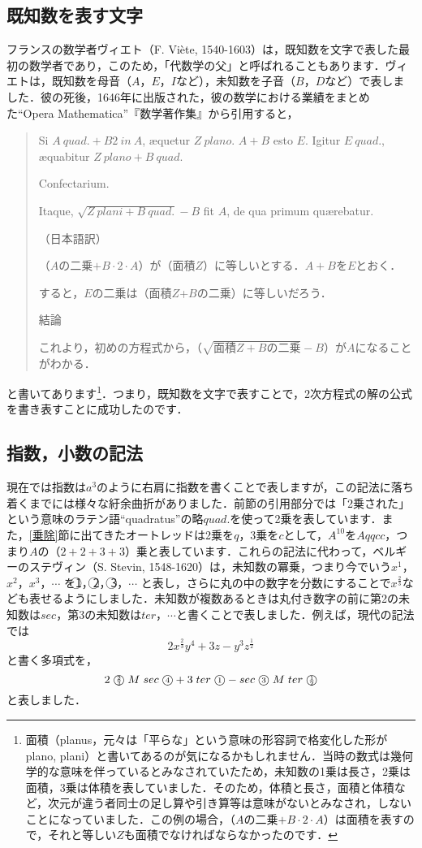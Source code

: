 \documentclass[8pt,a4j]{jreport}
\begin{document}
\subsection{既知数を表す文字}
フランスの数学者ヴィエト（F. Vi\`ete, 1540-1603）は，既知数を文字で表した最初の数学者であり，このため，「代数学の父」と呼ばれることもあります．ヴィエトは，既知数を母音（$A$，$E$，$I$など），未知数を子音（$B$，$D$など）で表しました．彼の死後，1646年に出版された，彼の数学における業績をまとめた``Opera Mathematica''『数学著作集』から引用すると，
\begin{quote}
Si $A\ quad. +B2\ in\ A$, \ae quetur $Z\ plano$. $A+B$ esto $E$. Igitur $E\ quad.$, \ae quabitur $Z\ plano+B\ quad.$

Confectarium.

Itaque, $\sqrt{Z\ plani+B\ quad.}-B$ fit $A$, de qua primum qu\ae rebatur.\smallskip

（日本語訳）

（$A$の二乗$+B\cdot 2\cdot A$）が（面積$Z$）に等しいとする．$A+B$を$E$とおく．

すると，$E$の二乗は（面積$Z$+$B$の二乗）に等しいだろう．

結論

これより，初めの方程式から，（$\sqrt{\mbox{面積}Z+B\mbox{の二乗}}-B$）が$A$になることがわかる．
\end{quote}
と書いてあります\footnote{面積（planus，元々は「平らな」という意味の形容詞で格変化した形がplano, plani）と書いてあるのが気になるかもしれません．当時の数式は幾何学的な意味を伴っているとみなされていたため，未知数の1乗は長さ，2乗は面積，3乗は体積を表していました．そのため，体積と長さ，面積と体積など，次元が違う者同士の足し算や引き算等は意味がないとみなされ，しないことになっていました．この例の場合，（$A$の二乗$+B\cdot 2\cdot A$）は面積を表すので，それと等しい$Z$も面積でなければならなかったのです．}．つまり，既知数を文字で表すことで，2次方程式の解の公式を書き表すことに成功したのです．

\subsection{指数，小数の記法}
現在では指数は$a^3$のように右肩に指数を書くことで表しますが，この記法に落ち着くまでには様々な紆余曲折がありました．前節の引用部分では「2乗された」という意味のラテン語``quadratus''の略$quad.$を使って2乗を表しています．また，\ref{乗除}節に出てきたオートレッドは2乗を$q$，3乗を$c$として，$A^{10}$を$Aqqcc$，つまり$A$の（$2+2+3+3$）乗と表しています．これらの記法に代わって，ベルギーのステヴィン（S. Stevin, 1548-1620）は，未知数の冪乗，つまり今でいう$x^1$，$x^2$，$x^3$，$\cdots$ を\textcircled{\scriptsize 1}，\textcircled{\scriptsize 2}，\textcircled{\scriptsize 3}，$\cdots$ と表し，さらに丸の中の数字を分数にすることで$x^{\frac{2}{3}}$なども表せるようにしました．未知数が複数あるときは丸付き数字の前に第2の未知数は$sec$，第3の未知数は$ter$，$\cdots$と書くことで表しました．例えば，現代の記法では
\[
2x^{\frac{2}{3}}y^4+3z-y^3z^{\frac{1}{2}}
\]
と書く多項式を，
\[
2\;\mbox{\textcircled{\scriptsize $\frac{2}{3}$}}\;M\;sec\;\mbox{\textcircled{\scriptsize 4}}+3\;ter\;\mbox{\textcircled{\scriptsize 1}}-sec\;\mbox{\textcircled{\scriptsize 3}}\;M\;ter\;\mbox{\textcircled{\scriptsize $\frac{1}{2}$}}
\]
と表しました．
\end{document}
